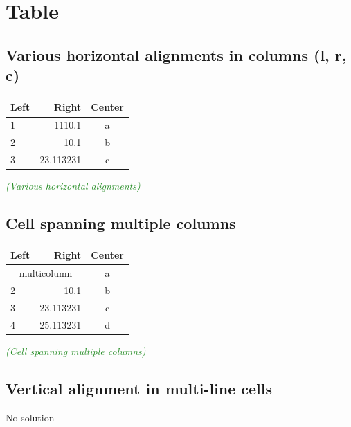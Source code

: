 \documentclass{article}
\newcommand{\ccheck}[1]{\textcolor{ForestGreen}{\emph{(\checkmark #1)}}} %
\begin{document}
\section{Table}
\subsection{Various horizontal alignments in columns (l, r, c)}
\begin{table}[h!]
  \begin{center}
    \begin{tabular}{l r c} %
      \textbf{Left} & \textbf{Right} & \textbf{Center}\\
      \hline
      1 & 1110.1 & a\\
      2 & 10.1 & b\\
      3 & 23.113231 & c\\
    \end{tabular}
  \end{center}
\end{table}
\ccheck{Various horizontal alignments}

\subsection{Cell spanning multiple columns}
\begin{table}[h!]
  \begin{center}
    \begin{tabular}{l|r|c}
      \textbf{Left} & \textbf{Right} & \textbf{Center}\\
      \hline
      \multicolumn{2}{c|}{multicolumn} & a\\ %
      \hline
      2 & 10.1 & b\\
      3 & 23.113231 & c\\
      4 & 25.113231 & d\\
    \end{tabular}
  \end{center}
\end{table}
\ccheck{Cell spanning multiple columns}

\subsection{Vertical alignment in multi-line cells}
No solution
\end{document}
